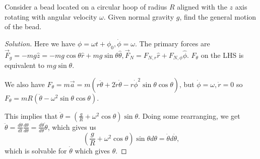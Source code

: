 \begin{prb}
\label{rotatinghoop}
Consider a bead located on a circular hoop of radius $R$ aligned with
the $z$ axis rotating with angular velocity $\omega$. Given normal
gravity $g$, find the general motion of the bead.
\end{prb}

\begin{proof}[Solution]
Here we have $\phi = \omega t + \phi_0, \dot{\phi} = \omega$. The
primary forces are $\vec{F}_g = -mg\hat{z} = -mg \cos \theta \hat{r} +
mg \sin \theta \hat{\theta}, \vec{F}_N = F_{N,r} \hat{r}
+ F_{N,\phi} \hat{\phi}$. $F_\theta$ on the LHS is equivalent to
$mg\sin \theta$.

We also have $F_\theta = m \vec{a} = m \left( r \ddot{\theta} + 2
\dot{r} \dot{\theta} - r \dot{\phi}^2 \sin \theta \cos \theta \right)$,
but $\dot{\phi} = \omega, \dot{r} = 0$ so $F_\theta = m R
\left(\ddot{\theta} - \omega^2 \sin \theta \cos \theta\right)$.

This implies that $\ddot{\theta} = \left(\frac{g}{R} + \omega^2 \cos
\theta \right) \sin \theta$. Doing some rearranging, we get
$\ddot{\theta} = \frac{d\dot{\theta}}{dt} \frac{d\theta}{d\theta} =
\frac{d\dot{\theta}}{d\theta} \dot{\theta}$, which gives us
\[ \left(\frac{g}{R} + \omega^2 \cos \theta\right) \sin \theta d \theta
= \dot{\theta} d \dot{\theta}, \]
which is solvable for $\dot{\theta}$ which gives $\theta$.
\end{proof}
